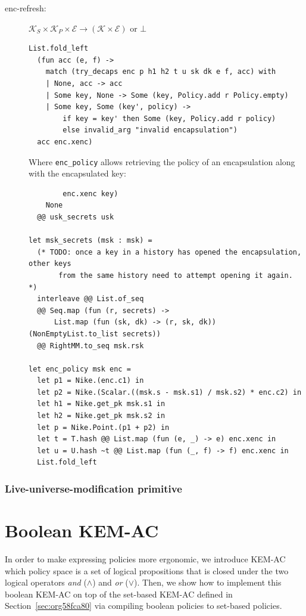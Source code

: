 \documentclass[a4paper]{article}
\theoremstyle{definition}
\newcommand{\cE}{\mathcal{E}}
\newcommand{\cK}{\mathcal{K}}
\begin{document}
\begin{description}
\item[{enc-refresh:}] \(\cK_S \times \cK_P \times \cE \rightarrow (\cK \times \cE)\)
or \(\bot\)

\begin{verbatim}
List.fold_left
  (fun acc (e, f) ->
    match (try_decaps enc p h1 h2 t u sk dk e f, acc) with
    | None, acc -> acc
    | Some key, None -> Some (key, Policy.add r Policy.empty)
    | Some key, Some (key', policy) ->
        if key = key' then Some (key, Policy.add r policy)
        else invalid_arg "invalid encapsulation")
  acc enc.xenc)
\end{verbatim}

Where \texttt{enc\_policy} allows retrieving the policy of an encapsulation along with
the encapsulated key:

\begin{verbatim}
        enc.xenc key)
    None
  @@ usk_secrets usk

let msk_secrets (msk : msk) =
  (* TODO: once a key in a history has opened the encapsulation, other keys
       from the same history need to attempt opening it again. *)
  interleave @@ List.of_seq
  @@ Seq.map (fun (r, secrets) ->
      List.map (fun (sk, dk) -> (r, sk, dk)) (NonEmptyList.to_list secrets))
  @@ RightMM.to_seq msk.rsk

let enc_policy msk enc =
  let p1 = Nike.(enc.c1) in
  let p2 = Nike.(Scalar.((msk.s - msk.s1) / msk.s2) * enc.c2) in
  let h1 = Nike.get_pk msk.s1 in
  let h2 = Nike.get_pk msk.s2 in
  let p = Nike.Point.(p1 + p2) in
  let t = T.hash @@ List.map (fun (e, _) -> e) enc.xenc in
  let u = U.hash ~t @@ List.map (fun (_, f) -> f) enc.xenc in
  List.fold_left
\end{verbatim}
\end{description}
\subsubsection{Live-universe-modification primitive}
\label{sec:org70fa593}
\section{Boolean KEM-AC}
\label{sec:org7501b11}

In order to  make expressing policies more ergonomic, we  introduce KEM-AC which
policy space  is a  set of  logical propositions  that is  closed under  the two
logical  operators \emph{and}  (\(\land\)) and  \emph{or} (\(\lor\)).   Then, we  show how  to
implement  this  boolean KEM-AC  on  top  of  the  set-based KEM-AC  defined  in
Section \ref{sec:org58fca80}  via compiling  boolean  policies  to
set-based policies.
\end{document}
